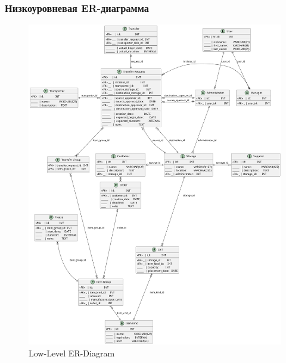 \newpage

\subsubsection{Низкоуровневая ER-диаграмма}

\begin{figure}[h!]
      \centering
      \includegraphics[width=12cm]{../../doc/spec/figure/er/low-level/Storage Net low-level ER Diagram.png}
      \caption{Low-Level ER-Diagram}
\end{figure}

\newpage